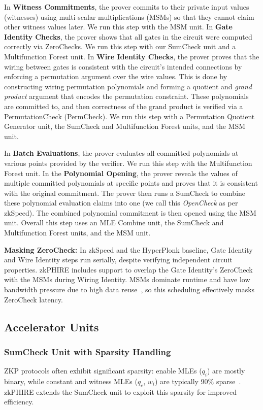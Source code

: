 In \textbf{Witness Commitments}, the prover commits to their private input values (witnesses) using multi-scalar multiplications (MSMs) so that they cannot claim other witness values later. We run this step with the MSM unit.
In \textbf{Gate Identity Checks}, the prover shows that all gates in the circuit were computed correctly via ZeroChecks. We run this step with our SumCheck unit and a Multifunction Forest unit.
In \textbf{Wire Identity Checks}, the prover proves that the wiring between gates is consistent with the circuit's intended connections
by enforcing a permutation argument over the wire values. This is done by constructing wiring permutation polynomials and forming a quotient and \textit{grand product} 
argument
that encodes the permutation constraint. These polynomials are committed to, and then correctness of the grand product is verified via a PermutationCheck (PermCheck).
We run this step with a Permutation Quotient Generator unit,
the SumCheck and Multifunction Forest units, and the MSM unit.

In \textbf{Batch Evaluations}, the prover evaluates all committed polynomials at various points provided by the verifier. We run this step with the Multifunction Forest unit.
In the \textbf{Polynomial Opening}, the prover reveals the values of multiple committed polynomials at specific points and proves that it is consistent with the original commitment. The prover then runs a SumCheck to combine these polynomial evaluation claims into one (we call this \textit{OpenCheck} as per zkSpeed).
The combined polynomial commitment is then opened using the MSM unit.
Overall this step uses an MLE Combine unit, the SumCheck and Multifunction Forest units, and the MSM unit.

\textbf{Masking ZeroCheck:} In zkSpeed and the HyperPlonk baseline, Gate Identity and Wire Identity steps run serially, despite verifying independent circuit properties. zkPHIRE includes support to overlap the Gate Identity’s ZeroCheck with the MSMs during Wiring Identity. MSMs dominate runtime and have low bandwidth pressure due to high data reuse~\cite{szkp, zkspeed2025}, so this scheduling effectively masks ZeroCheck latency.

\subsection{Accelerator Units}
\subsubsection{\textbf{SumCheck Unit with Sparsity Handling}} ZKP protocols often exhibit significant sparsity: enable MLEs ($q_i$) are mostly binary, while constant and witness MLEs ($q_c$, $w_i$) are typically 90\% sparse~\cite{szkp, pipezk, zkspeed2025}. zkPHIRE extends the SumCheck unit to exploit this sparsity for improved efficiency.


